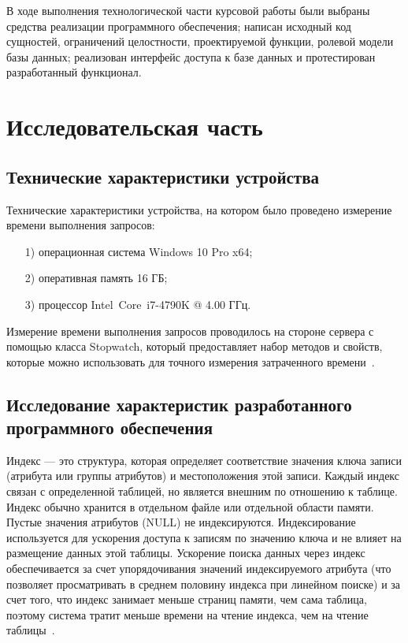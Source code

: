 \documentclass{bmstu}
\begin{document}
В ходе выполнения технологической части курсовой работы были выбраны средства реализации программного обеспечения; написан исходный код сущностей, ограничений целостности, проектируемой функции, ролевой модели базы данных; реализован интерфейс доступа к базе данных и протестирован разработанный функционал.

\chapter{Исследовательская часть}

\section{Технические характеристики устройства}

Технические характеристики устройства, на котором было проведено измерение времени выполнения запросов:

\begin{enumerate}
\item[1)]
операционная система Windows 10 Pro x64;
\item[2)]
оперативная память 16 ГБ;
\item[3)]
процессор Intel\textregistered ~Core\texttrademark ~i7-4790K @ 4.00 ГГц.
\end{enumerate}

Измерение времени выполнения запросов проводилось на стороне сервера с помощью класса Stopwatch, который предоставляет набор методов и свойств, которые можно использовать для точного измерения затраченного времени~\cite{Stopwatch}.

\section{Исследование характеристик разработанного программного обеспечения}

Индекс --- это структура, которая определяет соответствие значения ключа записи (атрибута или группы атрибутов) и местоположения этой записи. 
Каждый индекс связан с определенной таблицей, но является внешним по отношению к таблице. 
Индекс обычно хранится в отдельном файле или отдельной области памяти. 
Пустые значения атрибутов (NULL) не индексируются. 
Индексирование используется для ускорения доступа к записям по значению ключа и не влияет на размещение данных этой таблицы. 
Ускорение поиска данных через индекс обеспечивается за счет упорядочивания значений индексируемого атрибута (что позволяет просматривать в среднем половину индекса при линейном поиске) и за счет того, что индекс занимает меньше страниц памяти, чем сама таблица, поэтому система тратит меньше времени на чтение индекса, чем на чтение таблицы~\cite{Karpova2009}.
\end{document}
